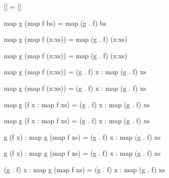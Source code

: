 \documentclass{beamer}
\newcommand{\ca}[1]{{\color{blue}#1}}
\newcommand{\cb}[1]{{\color{violet}#1}}
\newcommand{\cc}[1]{{\color{red}#1}}
\begin{document}
\begin{frame}[t,fragile]
\begin{center}
\begin{flushleft}
\begin{overprint}
\begin{semiverbatim}
              \alert<18>{[]} =             \alert<18>{[]}
\end{semiverbatim}

\begin{semiverbatim}
      map g (map f \alert<22>{bs})       = map (g . f) \alert<22>{bs}
\end{semiverbatim}

\begin{semiverbatim}
      map g (map f (x:xs))   = map (g . f) (x:xs)
\end{semiverbatim}

\begin{semiverbatim}
      map g (map f (x:xs))   = map \ca{(g . f)} (\cb{x}:\cc{xs})
\end{semiverbatim}

\begin{semiverbatim}
      map g (map f (x:xs))   = \ca{(g . f)} \cb{x} : map \ca{(g . f)} \cc{xs}
\end{semiverbatim}

\begin{semiverbatim}
      map g (map \ca{f} (\cb{x}:\cc{xs}))   = (g . f) x : map (g . f) xs
\end{semiverbatim}

\begin{semiverbatim}
      map g (\ca{f} \cb{x} : map \ca{f} \cc{xs}) = (g . f) x : map (g . f) xs
\end{semiverbatim}

\begin{semiverbatim}
      map \ca{g} (\cb{f x} : \cc{map f xs}) = (g . f) x : map (g . f) xs
\end{semiverbatim}

\begin{semiverbatim}
  \ca{g} (\cb{f x}) : map \ca{g} (\cc{map f xs}) = (g . f) x : map (g . f) xs
\end{semiverbatim}

\begin{semiverbatim}
  \alert{g (f x)} : map g (map f xs) = (g . f) x : map (g . f) xs
\end{semiverbatim}

\begin{semiverbatim}
\alert{(g . f) x} : map g (map f xs) = (g . f) x : map (g . f) xs
\end{semiverbatim}


\end{overprint}
\end{flushleft}
\end{center}
\end{frame}
\end{document}
